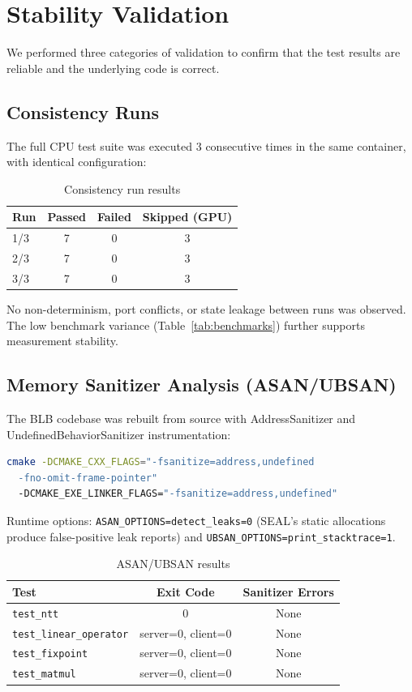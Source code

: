 \section{Stability Validation}\label{sec:stability}

We performed three categories of validation to confirm that the test results are reliable and the underlying code is correct.

\subsection{Consistency Runs}

The full CPU test suite was executed 3 consecutive times in the same container, with identical configuration:

\begin{table}[h]
\centering
\caption{Consistency run results}
\label{tab:consistency}
\begin{tabular}{lccc}
\toprule
Run & Passed & Failed & Skipped (GPU) \\
\midrule
1/3 & 7 & 0 & 3 \\
2/3 & 7 & 0 & 3 \\
3/3 & 7 & 0 & 3 \\
\bottomrule
\end{tabular}
\end{table}

No non-determinism, port conflicts, or state leakage between runs was observed.
The low benchmark variance (Table~\ref{tab:benchmarks}) further supports measurement stability.

\subsection{Memory Sanitizer Analysis (ASAN/UBSAN)}

The BLB codebase was rebuilt from source with AddressSanitizer and UndefinedBehaviorSanitizer instrumentation:
\begin{lstlisting}[language=bash]
cmake -DCMAKE_CXX_FLAGS="-fsanitize=address,undefined
  -fno-omit-frame-pointer"
  -DCMAKE_EXE_LINKER_FLAGS="-fsanitize=address,undefined"
\end{lstlisting}

Runtime options: \texttt{ASAN\_OPTIONS=detect\_leaks=0} (SEAL's static allocations produce false-positive leak reports) and \texttt{UBSAN\_OPTIONS=print\_stacktrace=1}.

\begin{table}[h]
\centering
\caption{ASAN/UBSAN results}
\label{tab:asan}
\begin{tabular}{lcc}
\toprule
Test & Exit Code & Sanitizer Errors \\
\midrule
\texttt{test\_ntt} & 0 & None \\
\texttt{test\_linear\_operator} & server=0, client=0 & None \\
\texttt{test\_fixpoint} & server=0, client=0 & None \\
\texttt{test\_matmul} & server=0, client=0 & None \\
\bottomrule
\end{tabular}
\end{table}

